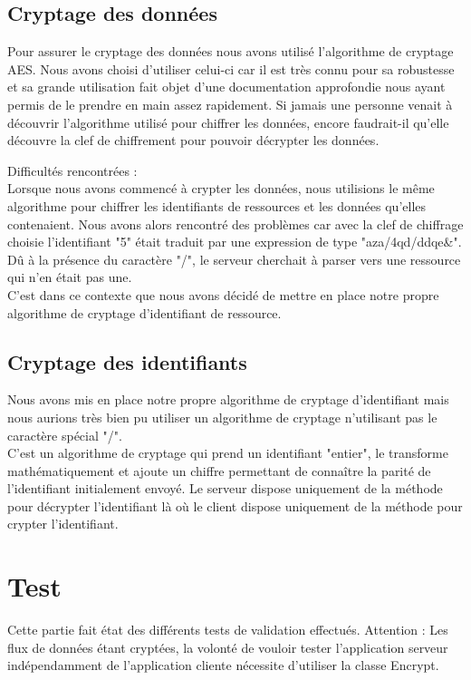 \subsection{Cryptage des données}
Pour assurer le cryptage des données nous avons utilisé l'algorithme de cryptage AES. Nous avons choisi d'utiliser celui-ci car il est très connu pour sa robustesse et sa grande utilisation fait objet d'une documentation approfondie nous ayant permis de le prendre en main assez rapidement.
Si jamais une personne venait à découvrir l'algorithme utilisé pour chiffrer les données, encore faudrait-il qu'elle découvre la clef de chiffrement pour pouvoir décrypter les données.

Difficultés rencontrées : \\
Lorsque nous avons commencé à crypter les données, nous utilisions le même algorithme pour chiffrer les identifiants de ressources et les données qu'elles contenaient.
Nous avons alors rencontré des problèmes car avec la clef de chiffrage choisie l'identifiant "5" était traduit par une expression de type "aza/4qd/ddqe\&".
Dû à la présence du caractère "/", le serveur cherchait à parser vers une ressource qui n'en était pas une.\\
C'est dans ce contexte que nous avons décidé de mettre en place notre propre algorithme de cryptage d'identifiant de ressource.

\subsection{Cryptage des identifiants}

Nous avons mis en place notre propre algorithme de cryptage d'identifiant mais nous aurions très bien pu utiliser un algorithme de cryptage n'utilisant pas le caractère spécial "/".\\
C'est un algorithme de cryptage qui prend un identifiant "entier", le transforme mathématiquement et ajoute un chiffre permettant de connaître la parité de l'identifiant initialement envoyé.
Le serveur dispose uniquement de la méthode pour décrypter l'identifiant là où le client dispose uniquement de la méthode pour crypter l'identifiant.

\newpage
\section{Test}

Cette partie fait état des différents tests de validation effectués.
Attention : Les flux de données étant cryptées, la volonté de vouloir tester l'application serveur indépendamment de l'application cliente nécessite d'utiliser la classe Encrypt.


